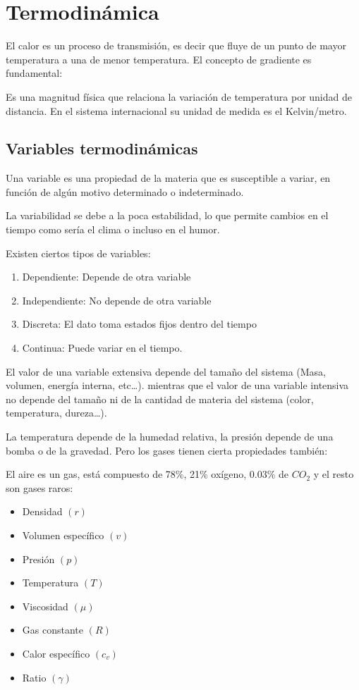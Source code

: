\chapter{Termodinámica}

El calor es un proceso de transmisión, es decir que fluye de un punto de mayor temperatura a una de menor 
temperatura. El concepto de gradiente es fundamental:

\begin{definition}[Gradiente]
    Es una magnitud física que relaciona la variación de temperatura por unidad de distancia. En el sistema internacional su unidad de medida es el Kelvin/metro. 
\end{definition}

\section{Variables termodinámicas}

Una variable es una propiedad de la materia que es susceptible a variar, en función de algún motivo determinado o indeterminado. 

La variabilidad se debe a la poca estabilidad, lo que permite cambios en el tiempo como sería el clima o incluso en el humor. 


Existen ciertos tipos de variables:  

\begin{enumerate}
    \item Dependiente: Depende de otra variable 
    \item Independiente: No depende de otra variable    
    \item Discreta: El dato toma estados fijos dentro del tiempo  
    \item Continua: Puede variar en el tiempo.
\end{enumerate}

El valor de una variable extensiva depende del tamaño del sistema (Masa, volumen, energía interna, etc\dots). mientras que el valor de una variable intensiva no depende del tamaño ni de la cantidad de materia del sistema (color, temperatura, dureza\dots).

La temperatura depende de la humedad relativa, la presión depende de una bomba o de la gravedad. Pero los gases 
tienen cierta propiedades también: 

El aire es un gas, está compuesto de 78\%, 21\% oxígeno, 0.03\% de $CO_2$ y el resto son gases raros:

\begin{itemize}
    \item Densidad $(r)$
    \item Volumen específico $(v)$
    \item Presión $(p)$
    \item Temperatura $(T)$
    \item Viscosidad $(\mu)$
    \item Gas constante $(R)$
    \item Calor específico $(c_v)$
    \item Ratio $(\gamma)$
\end{itemize}

